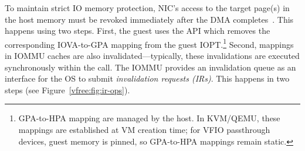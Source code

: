To maintain strict IO memory protection, NIC's access to the target page(s) in the host memory must be revoked immediately after the DMA completes~\cite{Rubin2024FastSafe,Amit2011vIOMMU}. This happens using two steps.
First, the guest uses the  API which removes 
    the corresponding IOVA-to-GPA mapping from the guest IOPT.\footnote{GPA-to-HPA mapping are managed by the host. In KVM/QEMU, these mappings are established at VM creation time; for VFIO passthrough devices, guest memory is pinned, so GPA-to-HPA mappings remain static.} %
Second,
    mappings in IOMMU caches are also invalidated---typically, these invalidations are executed synchronously within the  call.
The IOMMU provides an invalidation queue as an interface for the OS 
    to submit {\it invalidation requests (IRs)}. This happens in two steps (see Figure~\ref{vfree:fig:ir-ops}). 


   

